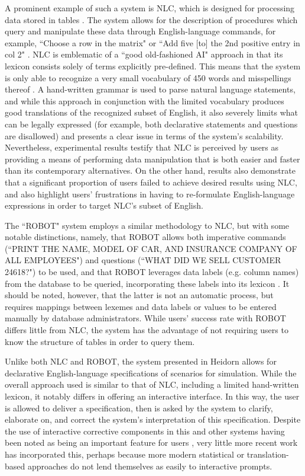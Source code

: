\documentclass[a4paper,11pt]{proposal}
\begin{document}
A prominent example of such a system is NLC, which is designed for processing data stored in tables \cite{ballard1979} \cite{biermann1983}. The system allows for the description of procedures which query and manipulate these data through English-language commands, for example, ``Choose a row in the matrix" or ``Add five [to] the 2nd positive entry in col 2" \cite{ballard1979}. NLC is emblematic of a ``good old-fashioned AI" approach in that its lexicon consists solely of terms explicitly pre-defined. This means that the system is only able to recognize a very small vocabulary of 450 words and misspellings thereof \cite{ballard1979}. A hand-written grammar is used to parse natural language statements, and while this approach in conjunction with the limited vocabulary produces good translations of the recognized subset of English, it also severely limits what can be legally expressed (for example, both declarative statements and questions are disallowed) and presents a clear issue in terms of the system's scalability. Nevertheless, experimental results \cite{biermann1983} testify that NLC is perceived by users as providing a means of performing data manipulation that is both easier and faster than its contemporary alternatives. On the other hand, results also demonstrate that a significant proportion of users failed to achieve desired results using NLC, and also highlight users' frustrations in having to re-formulate English-language expressions in order to target NLC's subset of English.

The ``ROBOT" system employs a similar methodology to NLC, but with some notable distinctions, namely, that ROBOT allows both imperative commands (``PRINT THE NAME, MODEL OF CAR, AND INSURANCE COMPANY OF ALL EMPLOYEES") and questions (``WHAT DID WE SELL CUSTOMER 24618?") to be used, and that ROBOT leverages data labels (e.g. column names) from the database to be queried, incorporating these labels into its lexicon \cite{harris1977}. It should be noted, however, that the latter is not an automatic process, but requires mappings between lexemes and data labels or values to be entered manually by database administrators. While users' success rate with ROBOT differs little from NLC, the system has the advantage of not requiring users to know the structure of tables in order to query them.

Unlike both NLC and ROBOT, the system presented in Heidorn \cite{heidorn1974} allows for declarative English-language specifications of scenarios for simulation. While the overall approach used is similar to that of NLC, including a limited hand-written lexicon, it notably differs in offering an interactive interface. In this way, the user is allowed to deliver a specification, then is asked by the system to clarify, elaborate on, and correct the system's interpretation of this specification. Despite the use of interactive corrective components in this and other systems having been noted as being an important feature for users \cite{capindale1990}, very little more recent work has incorporated this,  perhaps because more modern statistical or translation-based approaches do not lend themselves as easily to interactive prompts.
\end{document}
